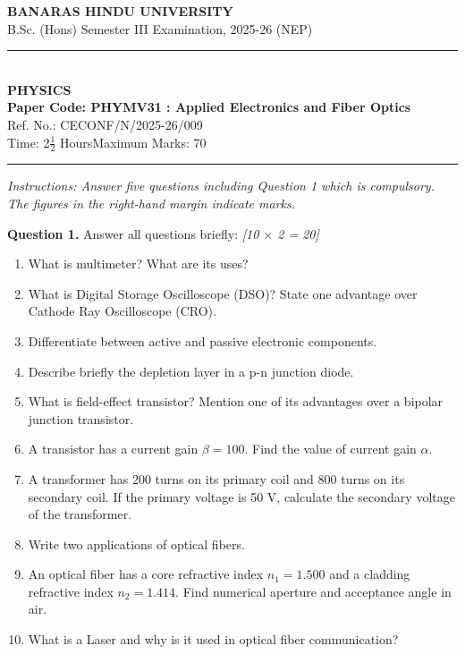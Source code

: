 \documentclass[11pt,a4paper]{article}
\newcommand{\pts}[1]{\hfill \textit{[#1]}}
\begin{document}
\begin{center}
  {\large\bfseries BANARAS HINDU UNIVERSITY}\\[2pt]
  {\normalsize B.Sc. (Hons) Semester III Examination, 2025-26 (NEP)}\\[6pt]
  \rule{0.8\linewidth}{0.5pt}\\[6pt]
  {\large\bfseries PHYSICS}\\[4pt]
  {\large\bfseries Paper Code: PHYMV31 : Applied Electronics and Fiber Optics}\\[2pt]
  {\small Ref. No.: CECONF/N/2025-26/009}\\[4pt]
  {\normalsize Time: 2$\frac{1}{2}$ Hours\hfill Maximum Marks: 70}
\end{center}

\rule{\linewidth}{0.4pt}

\smallskip

\noindent \textit{Instructions: Answer five questions including Question 1 which is compulsory. The figures in the right-hand margin indicate marks.}

\bigskip

\noindent \textbf{Question 1.} Answer all questions briefly: \pts{10 $\times$ 2 = 20}
\begin{enumerate}[label=(\alph*)]
  \item What is multimeter? What are its uses?
  \item What is Digital Storage Oscilloscope (DSO)? State one advantage over Cathode Ray Oscilloscope (CRO).
  \item Differentiate between active and passive electronic components.
  \item Describe briefly the depletion layer in a p-n junction diode.
  \item What is field-effect transistor? Mention one of its advantages over a bipolar junction transistor.
  \item A transistor has a current gain $\beta = 100$. Find the value of current gain $\alpha$.
  \item A transformer has 200 turns on its primary coil and 800 turns on its secondary coil. If the primary voltage is 50 V, calculate the secondary voltage of the transformer.
  \item Write two applications of optical fibers.
  \item An optical fiber has a core refractive index $n_1 = 1.500$ and a cladding refractive index $n_2 = 1.414$. Find numerical aperture and acceptance angle in air.
  \item What is a Laser and why is it used in optical fiber communication?
\end{enumerate}
\end{document}
